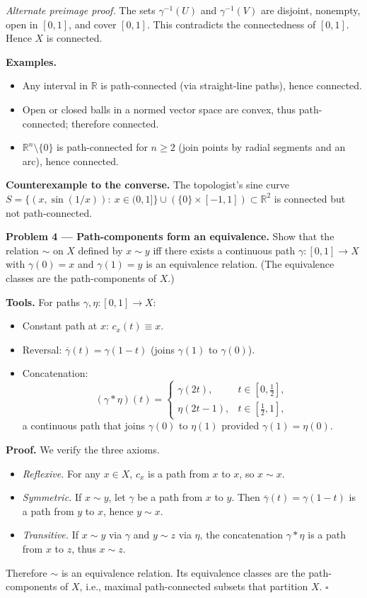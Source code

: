 \documentclass[12pt,a4paper]{article}
\newcommand{\qed}{\hfill$\square$}
\theoremstyle{plain}
\theoremstyle{definition}
\theoremstyle{remark}
\theoremstyle{remark}
\begin{document}
\smallskip
\noindent\emph{Alternate preimage proof.}
The sets $\gamma^{-1}(U)$ and $\gamma^{-1}(V)$ are disjoint, nonempty, open in
$[0,1]$, and cover $[0,1]$. This contradicts the connectedness of $[0,1]$.
Hence $X$ is connected.

\medskip
\noindent\textbf{Examples.}
\begin{itemize}
	\item Any interval in $\mathbb{R}$ is path-connected (via straight-line paths),
	hence connected.
	\item Open or closed balls in a normed vector space are convex, thus
	path-connected; therefore connected.
	\item $\mathbb{R}^n\setminus\{0\}$ is path-connected for $n\ge 2$ (join points by radial segments and an arc),
	hence connected.
\end{itemize}

\noindent\textbf{Counterexample to the converse.}
The topologist's sine curve
$S=\{(x,\sin(1/x)):\ x\in(0,1]\}\cup(\{0\}\times[-1,1])\subset\mathbb{R}^2$
is connected but not path-connected.

\noindent\textbf{Problem 4 — Path-components form an equivalence.}
Show that the relation $\sim$ on $X$ defined by
$x\sim y$ iff there exists a continuous path $\gamma:[0,1]\to X$
with $\gamma(0)=x$ and $\gamma(1)=y$ is an equivalence relation.
(The equivalence classes are the path-components of $X$.)

\medskip
\noindent\textbf{Tools.}
For paths $\gamma,\eta:[0,1]\to X$:
\begin{itemize}
	\item Constant path at $x$: $c_x(t)\equiv x$.
	\item Reversal: $\overline\gamma(t)=\gamma(1-t)$ (joins $\gamma(1)$ to $\gamma(0)$).
	\item Concatenation:
	\[
	(\gamma*\eta)(t)=
	\begin{cases}
		\gamma(2t), & t\in[0,\tfrac12],\\
		\eta(2t-1), & t\in[\tfrac12,1],
	\end{cases}
	\]
	a continuous path that joins $\gamma(0)$ to $\eta(1)$ provided $\gamma(1)=\eta(0)$.
\end{itemize}

\medskip
\noindent\textbf{Proof.}
We verify the three axioms.
\begin{itemize}
	\item \emph{Reflexive.} For any $x\in X$, $c_x$ is a path from $x$ to $x$, so $x\sim x$.
	\item \emph{Symmetric.} If $x\sim y$, let $\gamma$ be a path from $x$ to $y$.
	Then $\overline\gamma(t)=\gamma(1-t)$ is a path from $y$ to $x$, hence $y\sim x$.
	\item \emph{Transitive.} If $x\sim y$ via $\gamma$ and $y\sim z$ via $\eta$,
	the concatenation $\gamma*\eta$ is a path from $x$ to $z$, thus $x\sim z$.
\end{itemize}
Therefore $\sim$ is an equivalence relation. Its equivalence classes are the
path-components of $X$, i.e., maximal path-connected subsets that partition $X$.
\qed
\end{document}
